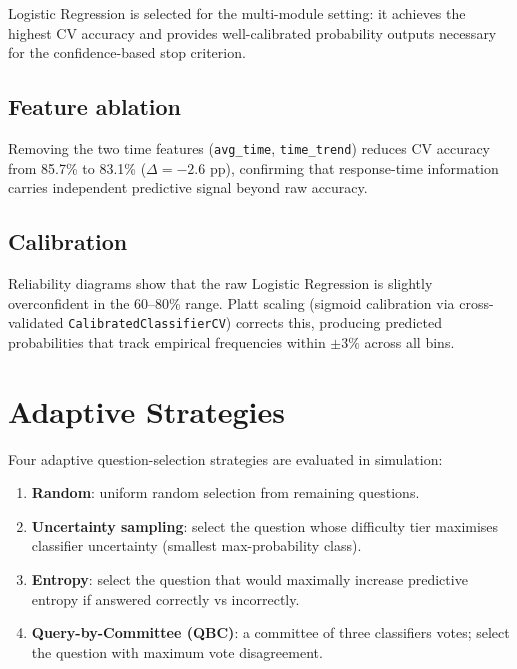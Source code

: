 \documentclass[12pt,a4paper]{article}
\begin{document}
Logistic Regression is selected for the multi-module setting: it achieves the highest
CV accuracy and provides well-calibrated probability outputs necessary for the
confidence-based stop criterion.

\subsection{Feature ablation}

Removing the two time features (\texttt{avg\_time}, \texttt{time\_trend}) reduces CV
accuracy from 85.7\% to 83.1\% ($\Delta = -2.6$ pp), confirming that response-time
information carries independent predictive signal beyond raw accuracy.

\subsection{Calibration}

Reliability diagrams show that the raw Logistic Regression is slightly overconfident
in the 60--80\% range. Platt scaling (sigmoid calibration via cross-validated
\texttt{CalibratedClassifierCV}) corrects this, producing predicted probabilities
that track empirical frequencies within $\pm 3\%$ across all bins.

\section{Adaptive Strategies}
\label{sec:adaptive}

Four adaptive question-selection strategies are evaluated in simulation:

\begin{enumerate}[noitemsep]
  \item \textbf{Random}: uniform random selection from remaining questions.
  \item \textbf{Uncertainty sampling}: select the question whose difficulty tier
        maximises classifier uncertainty (smallest max-probability class).
  \item \textbf{Entropy}: select the question that would maximally increase
        predictive entropy if answered correctly vs incorrectly.
  \item \textbf{Query-by-Committee (QBC)}: a committee of three classifiers
        votes; select the question with maximum vote disagreement.
\end{enumerate}
\end{document}
